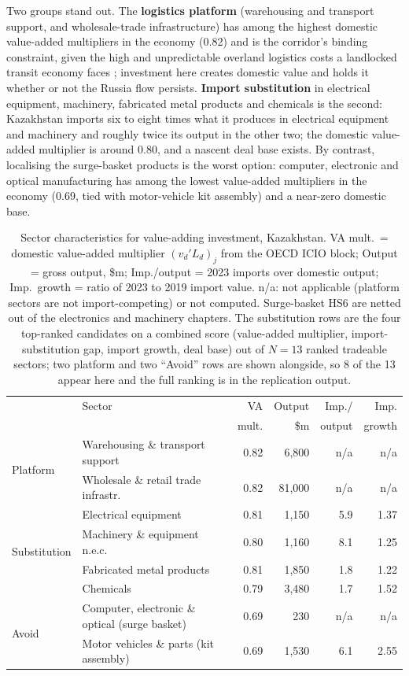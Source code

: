 \documentclass[12pt]{article}
\begin{document}
Two groups stand out. The \textbf{logistics platform} (warehousing and transport support, and
wholesale-trade infrastructure) has among the highest domestic value-added multipliers in the
economy (0.82) and is the corridor's binding constraint, given the high and unpredictable
overland logistics costs a landlocked transit economy faces \citep{arvis2010landlocked};
investment here creates
domestic value and holds it whether or not the Russia flow persists. \textbf{Import substitution} in
electrical equipment, machinery, fabricated metal products and chemicals is the second:
Kazakhstan imports six to eight times what it produces in electrical equipment and machinery
and roughly twice its output in the other two; the domestic value-added multiplier is around
0.80, and a nascent deal base exists. By contrast, localising
the surge-basket products is the worst option: computer, electronic and optical manufacturing
has among the lowest value-added multipliers in the economy (0.69, tied with motor-vehicle kit
assembly) and a near-zero domestic base.

\begin{table}[t]
\centering
\caption{Sector characteristics for value-adding investment, Kazakhstan. VA mult.\ =
domestic value-added multiplier $(v_d' L_d)_j$ from the OECD ICIO block; Output = gross output,
\$m; Imp./output = 2023 imports over domestic output; Imp.\ growth = ratio of 2023 to 2019
import value. n/a: not applicable (platform sectors are not import-competing) or not
computed. Surge-basket HS6 are netted out of the electronics and machinery chapters. The
substitution rows are the four top-ranked candidates on a combined score (value-added
multiplier, import-substitution gap, import growth, deal base) out of $N = 13$ ranked
tradeable sectors; two platform and two ``Avoid'' rows are shown alongside, so 8 of the 13
appear here and the full ranking is in the replication output.}
\label{tab:priority}
\small
\begin{tabular}{@{}p{1.5cm}p{5.4cm}rrrr@{}}
\toprule
& Sector & VA & Output & Imp./ & Imp. \\
& & mult. & \$m & output & growth \\
\midrule
\multirow{2}{1.5cm}{Platform}
 & Warehousing \& transport support & 0.82 & 6{,}800 & n/a & n/a \\
 & Wholesale \& retail trade infrastr. & 0.82 & 81{,}000 & n/a & n/a \\[2pt]
\multirow{4}{1.5cm}{Substi\-tution}
 & Electrical equipment & 0.81 & 1{,}150 & 5.9 & 1.37 \\
 & Machinery \& equipment n.e.c. & 0.80 & 1{,}160 & 8.1 & 1.25 \\
 & Fabricated metal products & 0.81 & 1{,}850 & 1.8 & 1.22 \\
 & Chemicals & 0.79 & 3{,}480 & 1.7 & 1.52 \\[2pt]
\multirow{2}{1.5cm}{Avoid}
 & Computer, electronic \& optical (surge basket) & 0.69 & 230 & n/a & n/a \\
 & Motor vehicles \& parts (kit assembly) & 0.69 & 1{,}530 & 6.1 & 2.55 \\
\bottomrule
\end{tabular}
\end{table}
\end{document}
